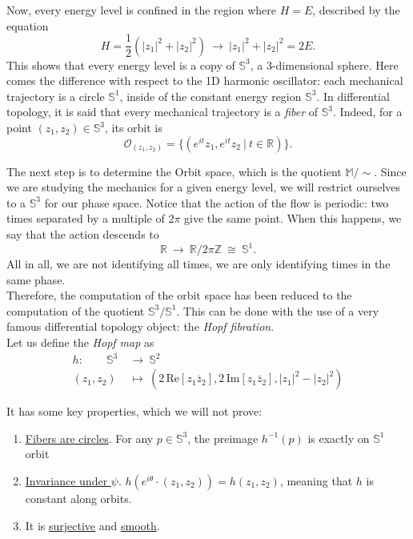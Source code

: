 \documentclass[12pt]{article}
\theoremstyle{plain}
\newcommand{\R}{\mathbb{R}}
\newcommand{\M}{\mathbb{M}}
\newcommand{\Sp}{\mathbb{S}}
\begin{document}
Now, every energy level is confined in the region where $H = E$, described by the equation $$H = \frac{1}{2}\left(|z_1|^2 + |z_2|^2\right)\ \longrightarrow\ |z_1|^2 + |z_2|^2 = 2E.$$
This shows that every energy level is a copy of $\Sp^3$, a $3$-dimensional sphere. Here comes the difference with respect to the 1D harmonic oscillator: each mechanical trajectory is a circle $\Sp^1$, inside of the constant energy region $\Sp^3$. In differential topology, it is said that every mechanical trajectory is a \textit{fiber} of $\Sp^3$. Indeed, for a point $(z_1,z_2)\in\Sp^3$, its orbit is $$\mathcal{O}_{(z_1,z_2)} = \{\left(e^{it}z_1, e^{it}z_2\ |\ t\in\R\right)\}.$$

The next step is to determine the Orbit space, which is the quotient $\M/\sim$. Since we are studying the mechanics for a given energy level, we will restrict ourselves to a $\Sp^3$ for our phase space. Notice that the action of the flow is periodic: two times separated by a multiple of $2\pi$ give the same point. When this happens, we say that the action descends to $$\R\ \to\ \R/2\pi\mathbb{Z}\ \cong\ \Sp^1.$$ All in all, we are not identifying all times, we are only identifying times in the same phase.\\

Therefore, the computation of the orbit space has been reduced to the computation of the quotient $\Sp^3/\Sp^1$. This can be done with the use of a very famous differential topology object: the \textit{Hopf fibration}.\\

Let us define the \textit{Hopf map} as 
\begin{align*}
    h\colon\qquad \Sp^3\ &\longrightarrow\ \Sp^2\\
    (z_1,z_2)\ &\longmapsto\ \left(2\,\mathrm{Re}[z_1\overline{z}_2], 2\,\mathrm{Im}[z_1\overline{z}_2], |z_1|^2 - |z_2|^2\right)
\end{align*}

It has some key properties, which we will not prove:
\begin{enumerate}
    \item \underline{Fibers are circles}. For any $p\in\Sp^3$, the preimage $h^{-1}(p)$ is exactly on $\Sp^1$ orbit
    \item \underline{Invariance under $\psi$}. $h(e^{i\theta}\cdot(z_1,z_2)) = h(z_1,z_2)$, meaning that $h$ is constant along orbits.
    \item It is \underline{surjective} and \underline{smooth}.
\end{enumerate}
\end{document}
